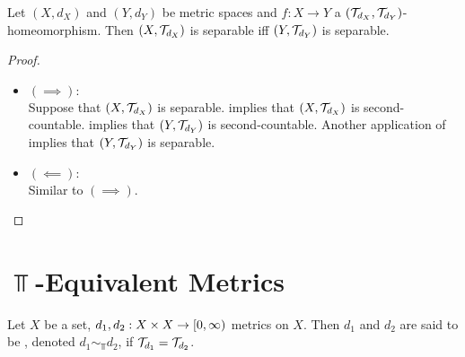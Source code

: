 \documentclass{book}
\begin{document}
\begin{ex} 
	Let $(X, d_X)$ and $(Y, d_Y)$ be metric spaces and $f:X \rightarrow Y$ a $(\mathcal{T}_{d_X}, \mathcal{T}_{d_Y})$-homeomorphism. Then $(X, \mathcal{T}_{d_X})$ is separable iff $(Y, \mathcal{T}_{d_Y})$ is separable. 
\end{ex}

\begin{proof}\
	\begin{itemize}
		\item $(\implies): $ \\
		Suppose that $(X, \mathcal{T}_{d_X})$ is separable.  implies that $(X, \mathcal{T}_{d_X})$ is second-countable.  implies that $(Y, \mathcal{T}_{d_Y})$ is second-countable. Another application of  implies that $(Y, \mathcal{T}_{d_Y})$ is separable.
		\item $(\impliedby): $ \\
		Similar to $(\implies)$.
	\end{itemize}
	
\end{proof}














































\newpage
\section{$\Top$-Equivalent Metrics}

\begin{defn} 
	Let $X$ be a set, $d_1, d_2: X \times X \rightarrow [0,\infty)$ metrics on $X$. Then $d_1$ and $d_2$ are said to be  , denoted $d_1 \sim_{\Top} d_2$, if $\mathcal{T}_{d_1} = \mathcal{T}_{d_2}$.
\end{defn}	
\end{document}
